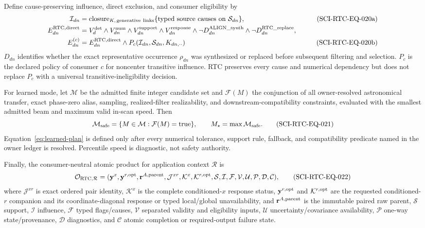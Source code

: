 Define cause-preserving influence, direct exclusion, and consumer eligibility
by
\begin{align}
 \mathcal I_{dn}
   &=\operatorname{closure}_{K,\,\mathrm{generative\ links}}
     \{\text{typed source causes on }\mathcal S_{dn}\},
 &\tag{SCI-RTC-EQ-020a}\label{eq:influence}\\
 E^{\rm RTC,direct}_{dn}
   &=V^{\rm det}_d\land V^{\rm num}_{dn}\land
     V^{\rm support}_{dn}\land V^{\rm response}_{dn}
     \land\neg D^{\rm ALIGN\_synth}_{dn}
     \land\neg D^{\rm RTC\_replace}_{dn},
 &\notag\\
 E^{(c)}_{dn}&=E^{\rm RTC,direct}_{dn}\land
 P_c(\mathcal I_{dn},\mathcal S_{dn},K_{dn,\cdot\cdot})
 &\tag{SCI-RTC-EQ-020b}\label{eq:eligibility}
\end{align}
$D_{dn}$ identifies whether the exact representative occurrence $\rho_{dn}$
was synthesized or replaced before subsequent filtering and selection.
$P_c$ is the declared policy of consumer $c$ for noncenter transitive
influence.  RTC preserves every cause and numerical dependency but does not
replace $P_c$ with a universal transitive-ineligibility decision.

For learned mode, let $\mathcal M$ be the admitted finite integer candidate
set and $\mathcal F(M)$ the conjunction of all owner-resolved astronomical
transfer, exact phase-zero alias, sampling, realized-filter realizability,
and downstream-compatibility constraints, evaluated with the smallest
admitted beam and maximum valid in-scan speed.  Then
\begin{equation}
 \mathcal M_{\rm safe}=\{M\in\mathcal M:\mathcal F(M)=\mathrm{true}\},
 \qquad M_\star=\max\mathcal M_{\rm safe}.
 \tag{SCI-RTC-EQ-021}\label{eq:learned-plan}
\end{equation}
Equation~\eqref{eq:learned-plan} is defined only after every numerical
tolerance, support rule, fallback, and compatibility predicate named in the
owner ledger is resolved.  Percentile speed is diagnostic, not safety
authority.

Finally, the consumer-neutral atomic product for application context
$\mathcal R$ is
\begin{equation}
 \mathcal O_{\rm RTC,\mathcal R}=
 (\mathbf y^x,\mathbf y^{r,\rm opt},\mathbf r^{A,\rm parent},\mathcal J^{xr},
  \mathcal K^{x},\mathcal K^{r,\rm opt},\mathcal S,\mathcal I,
  \mathcal F,\mathcal V,\mathcal U,\mathcal P,\mathcal D,\mathcal C),
 \tag{SCI-RTC-EQ-022}\label{eq:bundle}
\end{equation}
where $\mathcal J^{xr}$ is exact ordered pair identity, $\mathcal K^{x}$ is
the complete conditioned-$x$ response status, $\mathbf y^{r,\rm opt}$ and
$\mathcal K^{r,\rm opt}$ are the requested conditioned-$r$ companion and its
coordinate-diagonal response or typed local/global unavailability, and
$\mathbf r^{A,\rm parent}$ is the immutable paired raw parent,
$\mathcal S$ support, $\mathcal I$ influence, $\mathcal F$ typed flags/causes,
$\mathcal V$ separated validity and eligibility inputs, $\mathcal U$
uncertainty/covariance availability, $\mathcal P$ one-way state/provenance,
$\mathcal D$ diagnostics, and $\mathcal C$ atomic completion or required-output
failure state.

